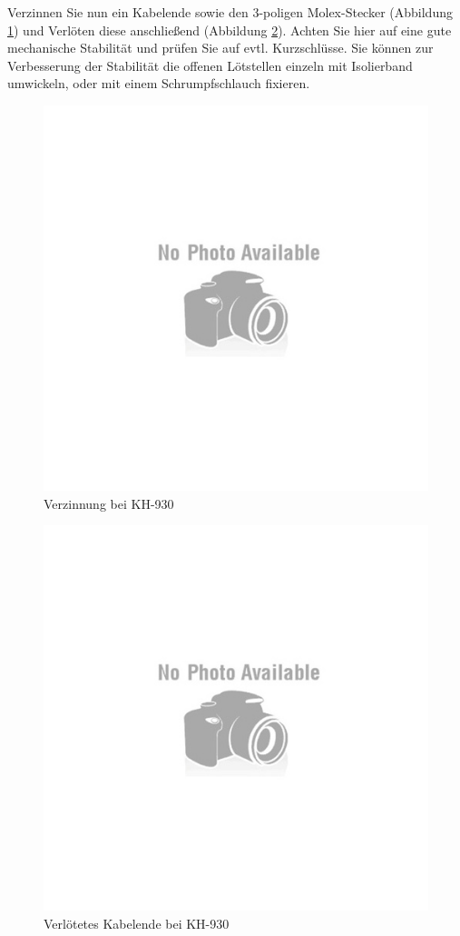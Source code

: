 \documentclass[fleqn,10pt]{SelfArx} %
\begin{document}
Verzinnen Sie nun ein Kabelende sowie den 3-poligen Molex-Stecker (Abbildung \ref{fig:abb7_6}) und Verlöten diese anschließend (Abbildung \ref{fig:abb7_7}). Achten Sie hier auf eine gute mechanische Stabilität und prüfen Sie auf evtl. Kurzschlüsse. Sie können zur Verbesserung der Stabilität die offenen Lötstellen einzeln mit Isolierband umwickeln, oder mit einem Schrumpfschlauch fixieren.

\begin{figure}[tbhp]\centering
\includegraphics[width=\linewidth]{no}
\caption{Verzinnung bei KH-930}
\label{fig:abb7_6}
\end{figure}

\begin{figure}[tbhp]\centering
\includegraphics[width=\linewidth]{no}
\caption{Verlötetes Kabelende bei KH-930}
\label{fig:abb7_7}
\end{figure}
\end{document}
